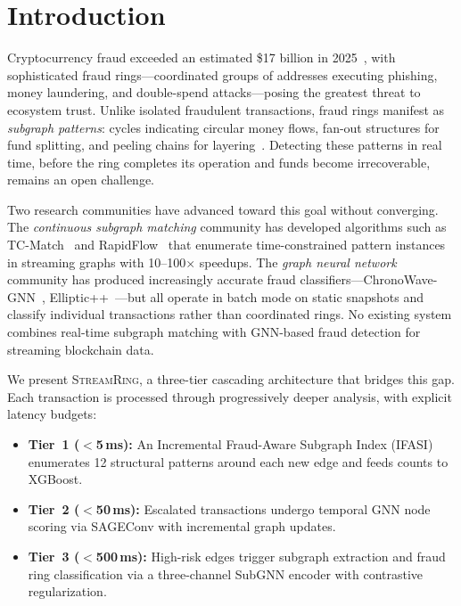 \documentclass[sigconf, anonymous, review]{acmart}
\begin{document}



\maketitle

\section{Introduction}
\label{sec:intro}

Cryptocurrency fraud exceeded an estimated \$17 billion in 2025~\cite{chainalysis2025}, with sophisticated fraud rings---coordinated groups of addresses executing phishing, money laundering, and double-spend attacks---posing the greatest threat to ecosystem trust. Unlike isolated fraudulent transactions, fraud rings manifest as \emph{subgraph patterns}: cycles indicating circular money flows, fan-out structures for fund splitting, and peeling chains for layering~\cite{spade2024}. Detecting these patterns in real time, before the ring completes its operation and funds become irrecoverable, remains an open challenge.

Two research communities have advanced toward this goal without converging. The \emph{continuous subgraph matching} community has developed algorithms such as TC-Match~\cite{tcmatch2024} and RapidFlow~\cite{rapidflow2022} that enumerate time-constrained pattern instances in streaming graphs with 10--100$\times$ speedups. The \emph{graph neural network} community has produced increasingly accurate fraud classifiers---ChronoWave-GNN~\cite{chronowave2025}, Elliptic++~\cite{ellipticpp2023}---but all operate in batch mode on static snapshots and classify individual transactions rather than coordinated rings. No existing system combines real-time subgraph matching with GNN-based fraud detection for streaming blockchain data.

We present \textsc{StreamRing}, a three-tier cascading architecture that bridges this gap. Each transaction is processed through progressively deeper analysis, with explicit latency budgets:
%
\begin{itemize}
    \item \textbf{Tier~1 ($<$5\,ms):} An Incremental Fraud-Aware Subgraph Index (IFASI) enumerates 12 structural patterns around each new edge and feeds counts to XGBoost.
    \item \textbf{Tier~2 ($<$50\,ms):} Escalated transactions undergo temporal GNN node scoring via SAGEConv with incremental graph updates.
    \item \textbf{Tier~3 ($<$500\,ms):} High-risk edges trigger subgraph extraction and fraud ring classification via a three-channel SubGNN encoder with contrastive regularization.
\end{itemize}
\end{document}
